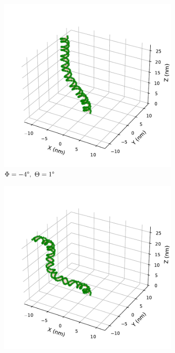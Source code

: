 \documentclass[a4paper,10pt]{article}
\begin{document}
\begin{figure}[tb]
\centering
\begin{subfigure}{0.3\textwidth}
\includegraphics[width=\textwidth]{bw_-4_1.pdf}
\caption{$\Phi=-4\degree,\ \Theta=1\degree$}
\label{fig:bend_a}
\end{subfigure}
\begin{subfigure}{0.3\textwidth}
\includegraphics[width=\textwidth]{bw_-4_3.pdf}

\end{subfigure}
\end{figure}
\end{document}
